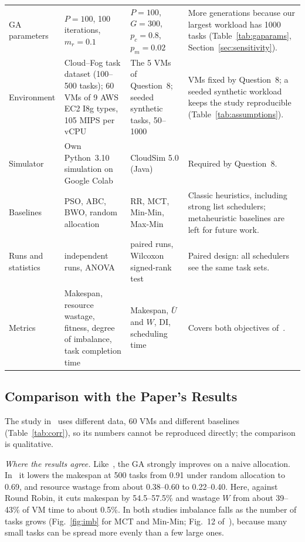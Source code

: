 \documentclass[journal,onecolumn,12pt]{IEEEtran}
\newcommand{\Ubar}{\bar{U}}
\begin{document}
\begin{table}[!htbp]
\begin{threeparttable}
\begin{tabularx}{\textwidth}{@{}>{\raggedright\arraybackslash}p{2.1cm}>{\raggedright\arraybackslash}p{3.6cm}>{\raggedright\arraybackslash}p{3.6cm}>{\raggedright\arraybackslash}X@{}}
GA parameters & $P=100$, 100 iterations, $m_r=0.1$ & $P=100$, $G=300$, $p_c=0.8$, $p_m=0.02$ & More generations because our largest workload has 1000 tasks (Table~\ref{tab:gaparams}, Section~\ref{sec:sensitivity}). \\
Environment & Cloud--Fog task dataset (100--500 tasks); 60 VMs of 9 AWS EC2 I8g types, 105 MIPS per vCPU & The 5 VMs of Question~8; seeded synthetic tasks, 50--1000 & VMs fixed by Question~8; a seeded synthetic workload keeps the study reproducible (Table~\ref{tab:assumptions}). \\
Simulator & Own Python~3.10 simulation on Google Colab & CloudSim 5.0 (Java) & Required by Question~8. \\
Baselines & PSO, ABC, BWO, random allocation & RR, MCT, Min-Min, Max-Min & Classic heuristics, including strong list schedulers; metaheuristic baselines are left for future work. \\
Runs and statistics & 20 independent runs, ANOVA & 10 paired runs, Wilcoxon signed-rank test & Paired design: all schedulers see the same task sets. \\
Metrics & Makespan, resource wastage, fitness, degree of imbalance, task completion time & Makespan, $\Ubar$ and $W$, DI, scheduling time & Covers both objectives of~\cite{dehury}. \\
\bottomrule
\end{tabularx}
\end{threeparttable}
\end{table}

\subsection{Comparison with the Paper's Results}
The study in~\cite{dehury} uses different data, 60 VMs and different baselines (Table~\ref{tab:corr}), so its numbers cannot be reproduced directly; the comparison is qualitative.

\textit{Where the results agree.} Like~\cite{dehury}, the GA strongly improves on a naive allocation. In~\cite{dehury} it lowers the makespan at 500 tasks from 0.91 under random allocation to 0.69, and resource wastage from about 0.38--0.60 to 0.22--0.40. Here, against Round Robin, it cuts makespan by 54.5--57.5\% and wastage $W$ from about 39--43\% of VM time to about 0.5\%. In both studies imbalance falls as the number of tasks grows (Fig.~\ref{fig:imb} for MCT and Min-Min; Fig.~12 of~\cite{dehury}), because many small tasks can be spread more evenly than a few large ones.
\end{document}
